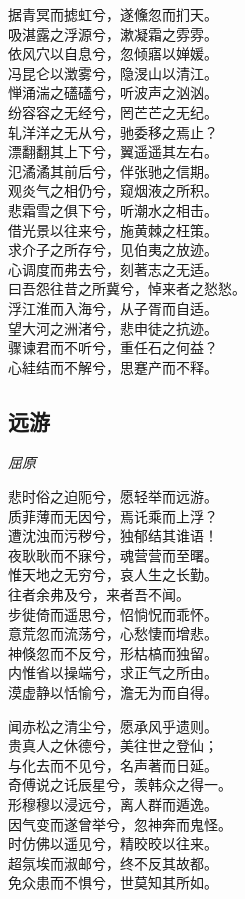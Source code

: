 \documentclass[]{article}
\begin{document}
据青冥而摅虹兮，遂儵忽而扪天。\\
吸湛露之浮源兮，漱凝霜之雰雰。\\
依风穴以自息兮，忽倾寤以婵媛。\\
冯昆仑以澂雾兮，隐渂山以清江。\\
惮涌湍之礚礚兮，听波声之汹汹。\\
纷容容之无经兮，罔芒芒之无纪。\\
轧洋洋之无从兮，驰委移之焉止？\\
漂翻翻其上下兮，翼遥遥其左右。\\
氾潏潏其前后兮，伴张驰之信期。\\
观炎气之相仍兮，窥烟液之所积。\\
悲霜雪之俱下兮，听潮水之相击。\\
借光景以往来兮，施黄棘之枉策。\\
求介子之所存兮，见伯夷之放迹。\\
心调度而弗去兮，刻著志之无适。\\
曰吾怨往昔之所冀兮，悼来者之悐悐。\\
浮江淮而入海兮，从子胥而自适。\\
望大河之洲渚兮，悲申徒之抗迹。\\
骤谏君而不听兮，重任石之何益？\\
心絓结而不解兮，思蹇产而不释。

\hypertarget{header-n2885}{%
\subsection{远游}\label{header-n2885}}

\emph{屈原}

悲时俗之迫阨兮，愿轻举而远游。\\
质菲薄而无因兮，焉讬乘而上浮？\\
遭沈浊而污秽兮，独郁结其谁语！\\
夜耿耿而不寐兮，魂营营而至曙。\\
惟天地之无穷兮，哀人生之长勤。\\
往者余弗及兮，来者吾不闻。\\
步徙倚而遥思兮，怊惝怳而乖怀。\\
意荒忽而流荡兮，心愁悽而增悲。\\
神倏忽而不反兮，形枯槁而独留。\\
内惟省以操端兮，求正气之所由。\\
漠虚静以恬愉兮，澹无为而自得。

闻赤松之清尘兮，愿承风乎遗则。\\
贵真人之休德兮，美往世之登仙；\\
与化去而不见兮，名声著而日延。\\
奇傅说之讬辰星兮，羡韩众之得一。\\
形穆穆以浸远兮，离人群而遁逸。\\
因气变而遂曾举兮，忽神奔而鬼怪。\\
时仿佛以遥见兮，精晈晈以往来。\\
超氛埃而淑邮兮，终不反其故都。\\
免众患而不惧兮，世莫知其所如。
\end{document}
